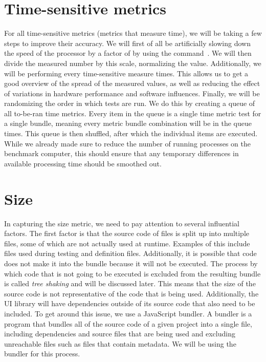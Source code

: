 \section{Time-sensitive metrics}\label{sec:experimental-setup:time-sensitive-metrics}
For all time-sensitive metrics (metrics that measure time), we will be taking a few steps to improve their accuracy. We will first of all be artificially slowing down the speed of the processor by a factor of \slowdownFactor{} by using the  command~. We will then divide the measured number by this scale, normalizing the value. Additionally, we will be performing every time-sensitive measure \numMeasures{} times. This allows us to get a good overview of the spread of the measured values, as well as reducing the effect of variations in hardware performance and software influences. Finally, we will be randomizing the order in which tests are run. We do this by creating a queue of all to-be-ran time metrics. Every item in the queue is a single time metric test for a single bundle, meaning every metric bundle combination will be in the queue \numMeasures{} times. This queue is then shuffled, after which the individual items are executed. While we already made sure to reduce the number of running processes on the benchmark computer, this should ensure that any temporary differences in available processing time should be smoothed out.


\section{Size}\label{sec:experimental-setup:size}
In capturing the size metric, we need to pay attention to several influential factors. The first factor is that the source code of files is split up into multiple files, some of which are not actually used at runtime. Examples of this include files used during testing and definition files. Additionally, it is possible that code does not make it into the bundle because it will not be executed. The process by which code that is not going to be executed is excluded from the resulting bundle is called \emph{tree shaking} and will be discussed later. This means that the size of the source code is not representative of the code that is being used. Additionally, the UI library will have dependencies outside of its source code that also need to be included. To get around this issue, we use a JavaScript bundler. A bundler is a program that bundles all of the source code of a given project into a single file, including dependencies and source files that are being used and excluding unreachable files such as files that contain metadata. We will be using the  bundler for this process.

